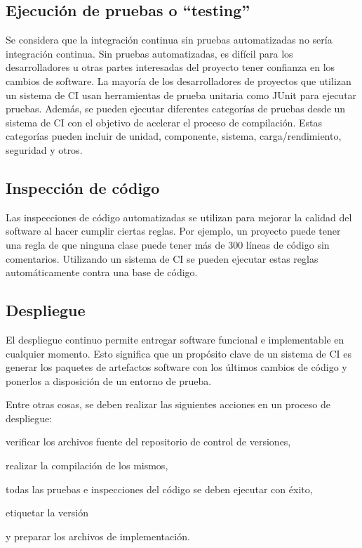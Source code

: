 \subsection{Ejecución de pruebas o “testing”}
Se considera que la integración continua sin pruebas automatizadas no sería integración continua. Sin pruebas automatizadas, es difícil para los desarrolladores u otras partes interesadas del proyecto tener confianza en los cambios de software. La mayoría de los desarrolladores de proyectos que utilizan un sistema de CI usan herramientas de prueba unitaria como JUnit para ejecutar pruebas. Además, se pueden ejecutar diferentes categorías de pruebas desde un sistema de CI con el objetivo de acelerar el proceso de compilación. Estas categorías pueden incluir de unidad, componente, sistema, carga/rendimiento, seguridad y otros.

\subsection{Inspección de código}
Las inspecciones de código automatizadas se utilizan para mejorar la calidad del software al hacer cumplir ciertas reglas. Por ejemplo, un proyecto puede tener una regla de que ninguna clase puede tener más de 300 líneas de código sin comentarios. Utilizando un sistema de CI se pueden ejecutar estas reglas automáticamente contra una base de código.

\subsection{Despliegue}
El despliegue continuo permite entregar software funcional e implementable en cualquier momento. Esto significa que un propósito clave de un sistema de CI es generar los paquetes de artefactos software con los últimos cambios de código y ponerlos a disposición de un entorno de prueba. 

Entre otras cosas, se deben realizar las siguientes acciones en un proceso de despliegue:
\begin{compactitem}
    \item verificar los archivos fuente del repositorio de control de versiones, 
    \item realizar la compilación de los mismos, 
    \item todas las pruebas e inspecciones del código se deben ejecutar con éxito,
    \item etiquetar la versión
    \item y preparar los archivos de implementación.
\end{compactitem}


